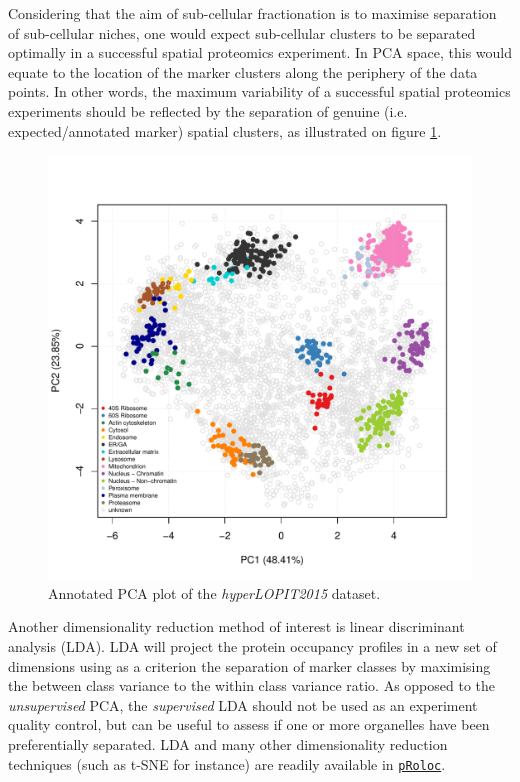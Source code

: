 \documentclass[12pt]{article}\usepackage[]{graphicx}\usepackage[]{color}
\newenvironment{knitrout}{}{} %
\newcommand{\Rpackage}[1]{\texttt{#1}}
\newcommand\Biocpkg[1]{%
  {\href{http://bioconductor.org/packages/#1}%
    {\Rpackage{#1}}}}
\begin{document}
Considering that the aim of sub-cellular fractionation is to maximise
separation of sub-cellular niches, one would expect sub-cellular
clusters to be separated optimally in a successful spatial proteomics
experiment. In PCA space, this would equate to the location of the
marker clusters along the periphery of the data points. In other
words, the maximum variability of a successful spatial proteomics
experiments should be reflected by the separation of genuine
(i.e. expected/annotated marker) spatial clusters, as illustrated on
figure \ref{fig:pcahl}.

\begin{figure}[ht]
  \centering
\begin{knitrout}
\color{fgcolor}
\includegraphics[width=0.75\linewidth]{figure/pcahl-1} 

\end{knitrout}
  \caption{Annotated PCA plot of the \textit{hyperLOPIT2015} dataset.}
  \label{fig:pcahl}
\end{figure}

Another dimensionality reduction method of interest is linear
discriminant analysis (LDA). LDA will project the protein occupancy
profiles in a new set of dimensions using as a criterion the
separation of marker classes by maximising the between class variance
to the within class variance ratio. As opposed to the
\textit{unsupervised} PCA, the \textit{supervised} LDA should not be
used as an experiment quality control, but can be useful to assess if
one or more organelles have been preferentially separated. LDA and
many other dimensionality reduction techniques (such as t-SNE
\cite{Maaten:2008} for instance) are readily available in
\Biocpkg{pRoloc}.
\end{document}
